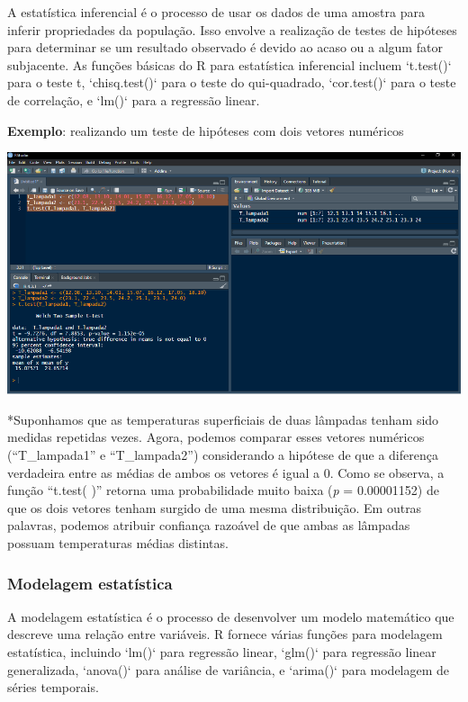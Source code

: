 \documentclass[
]{book}
\begin{document}
A estatística inferencial é o processo de usar os dados de uma amostra para inferir propriedades da população. Isso envolve a realização de testes de hipóteses para determinar se um resultado observado é devido ao acaso ou a algum fator subjacente. As funções básicas do R para estatística inferencial incluem `t.test()` para o teste t, `chisq.test()` para o teste do qui-quadrado, `cor.test()` para o teste de correlação, e `lm()` para a regressão linear.

\textbf{Exemplo}: realizando um teste de hipóteses com dois vetores numéricos

\includegraphics{images/clipboard-2899251105.png}

*Suponhamos que as temperaturas superficiais de duas lâmpadas tenham sido medidas repetidas vezes. Agora, podemos comparar esses vetores numéricos (``T\_lampada1'' e ``T\_lampada2'') considerando a hipótese de que a diferença verdadeira entre as médias de ambos os vetores é igual a 0. Como se observa, a função ``t.test( )'' retorna uma probabilidade muito baixa (\emph{p} = 0.00001152) de que os dois vetores tenham surgido de uma mesma distribuição. Em outras palavras, podemos atribuir confiança razoável de que ambas as lâmpadas possuam temperaturas médias distintas.

\subsubsection{Modelagem estatística}\label{modelagem-estatuxedstica}

A modelagem estatística é o processo de desenvolver um modelo matemático que descreve uma relação entre variáveis. R fornece várias funções para modelagem estatística, incluindo `lm()` para regressão linear, `glm()` para regressão linear generalizada, `anova()` para análise de variância, e `arima()` para modelagem de séries temporais.
\end{document}
